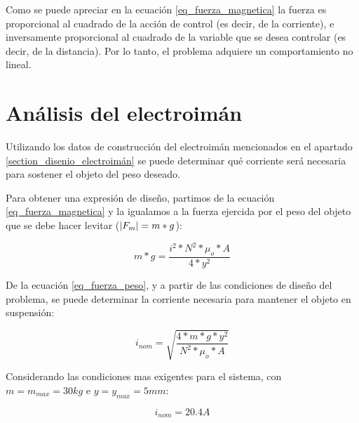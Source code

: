\noindent Como se puede apreciar en la ecuación \ref{eq_fuerza_magnetica} la fuerza es proporcional al cuadrado de la acción de control (es decir, de la corriente), e inversamente proporcional al cuadrado de la variable que se desea controlar (es decir, de la distancia). Por lo tanto, el problema adquiere un comportamiento no lineal.


\section{Análisis del electroimán}

\noindent Utilizando los datos de construcción del electroimán mencionados en el apartado \ref{section_disenio_electroimán} se puede determinar qué corriente será necesaria para sostener el objeto del peso deseado.



\noindent Para obtener una expresión de diseño, partimos de la ecuación \ref{eq_fuerza_magnetica} y la igualamos a la fuerza ejercida por el peso del objeto que se debe hacer levitar ($\lvert F_{m}\rvert=m*g$):

\begin{equation}\label{eq_fuerza_peso}
	m*g=\frac{i^{2}*N^{2}*\mu_{o}*A}{4*y^{2}}
\end{equation}

\noindent De la ecuación \ref{eq_fuerza_peso}, y a partir de las condiciones de diseño del problema, se puede determinar la corriente necesaria para mantener el objeto en suspensión:

\begin{equation} \label{eq_corriente_peso}
	i_{nom}=\sqrt{\frac{4*m*g*y^{2}}{N^{2}*\mu_{o}*A}}
\end{equation}

Considerando las condiciones mas exigentes para el sistema, con $m=m_{max}=30kg$ e $y=y_{max}=5mm$:

\begin{equation}
	i_{nom}=20.4A
\end{equation}

